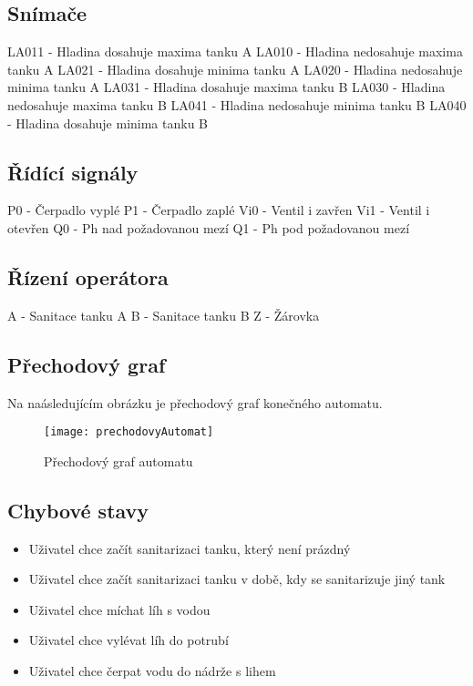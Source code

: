 \documentclass[12pt, a4paper]{article}
\begin{document}
\subsection{Snímače}
LA011 - Hladina dosahuje maxima tanku A \newline 
LA010 - Hladina nedosahuje maxima tanku A \newline 
LA021 - Hladina dosahuje minima tanku A \newline 
LA020 - Hladina nedosahuje minima tanku A \newline 
LA031 - Hladina dosahuje maxima tanku B \newline
LA030 - Hladina nedosahuje maxima tanku B \newline 
LA041 - Hladina nedosahuje minima tanku B \newline 
LA040 - Hladina dosahuje minima tanku B

\subsection{Řídící signály}
P0 - Čerpadlo vyplé \newline 
P1 - Čerpadlo zaplé \newline 
Vi0 - Ventil i zavřen \newline 
Vi1 - Ventil i otevřen \newline 
Q0 - Ph nad požadovanou mezí \newline 
Q1 - Ph pod požadovanou mezí 

\subsection{Řízení operátora}
A - Sanitace tanku A \newline 
B - Sanitace tanku B \newline 
Z - Žárovka

\subsection{Přechodový graf}
Na naásledujícím obrázku je přechodový graf konečného automatu.
\begin{figure}[h]
\centering 
\texttt{[image: prechodovyAutomat]}
\caption{Přechodový graf automatu}
\end{figure}

\subsection{Chybové stavy} \label{chyba}
\begin{itemize}
  \item Uživatel chce začít sanitarizaci tanku, který není prázdný
  \item Uživatel chce začít sanitarizaci tanku v době, kdy se sanitarizuje jiný tank
  \item Uživatel chce míchat líh s vodou
  \item Uživatel chce vylévat líh do potrubí
  \item Uživatel chce čerpat vodu do nádrže s lihem
\end{itemize}
\end{document}
